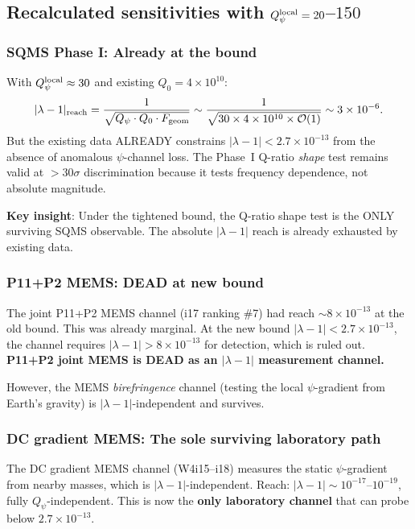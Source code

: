 \documentclass[11pt]{article}
\newcommand{\ee}[1]{\times 10^{#1}}
\newcommand{\lbone}{|\lambda - 1|}
\newcommand{\Qpsi}{Q_\psi}
\begin{document}
\subsection{Recalculated sensitivities with $\Qpsi^{\rm local} = 20$--$150$}

\subsubsection{SQMS Phase I: Already at the bound}

With $\Qpsi^{\rm local} \approx 30$ and existing $Q_0 = 4\ee{10}$:
\begin{equation}
\lbone_{\rm reach} = \frac{1}{\sqrt{\Qpsi \cdot Q_0 \cdot F_{\rm geom}}}
\sim \frac{1}{\sqrt{30 \times 4\ee{10} \times \mathcal{O}(1)}}
\sim 3\ee{-6}.
\end{equation}
But the existing data ALREADY constrains $\lbone < 2.7\ee{-13}$ from
the absence of anomalous $\psi$-channel loss. The Phase~I Q-ratio
\emph{shape} test remains valid at $>30\sigma$ discrimination because
it tests frequency dependence, not absolute magnitude.

\textbf{Key insight}: Under the tightened bound, the Q-ratio shape test
is the ONLY surviving SQMS observable. The absolute $\lbone$ reach is
already exhausted by existing data.

\subsubsection{P11+P2 MEMS: DEAD at new bound}

The joint P11+P2 MEMS channel (i17 ranking \#7) had reach $\sim 8\ee{-13}$
at the old bound. This was already marginal. At the new bound
$\lbone < 2.7\ee{-13}$, the channel requires $\lbone > 8\ee{-13}$
for detection, which is ruled out. \textbf{P11+P2 joint MEMS is DEAD
as an $\lbone$ measurement channel.}

However, the MEMS \emph{birefringence} channel (testing the local
$\psi$-gradient from Earth's gravity) is $\lbone$-independent and
survives.

\subsubsection{DC gradient MEMS: The sole surviving laboratory path}

The DC gradient MEMS channel (W4i15--i18) measures the static
$\psi$-gradient from nearby masses, which is $\lbone$-independent.
Reach: $\lbone \sim 10^{-17}$--$10^{-19}$, fully $\Qpsi$-independent.
This is now the \textbf{only laboratory channel} that can probe
below $2.7\ee{-13}$.
\end{document}
